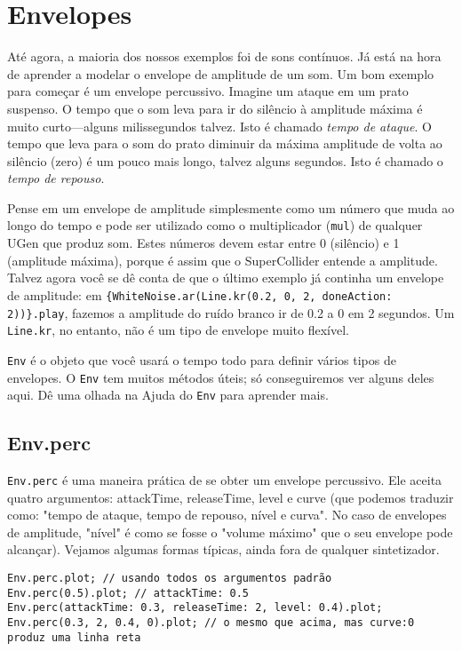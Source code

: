 \section{Envelopes}

Até agora, a maioria dos nossos exemplos foi de sons contínuos. Já está na hora de aprender a modelar o envelope de amplitude de um som. Um bom exemplo para começar é um envelope percussivo. Imagine um ataque em um prato suspenso. O tempo que o som leva para ir do silêncio à amplitude máxima é muito curto---alguns milissegundos talvez. Isto é chamado \emph{tempo de ataque}. O tempo que leva para o som do prato diminuir da máxima amplitude de volta ao silêncio (zero) é um pouco mais longo, talvez alguns segundos. Isto é chamado o \emph{tempo de repouso}.

Pense em um envelope de amplitude simplesmente como um número que muda ao longo do tempo e pode ser utilizado como o multiplicador (\texttt{mul}) de qualquer UGen que produz som. Estes números devem estar entre 0 (silêncio) e 1 (amplitude máxima), porque é assim que o SuperCollider entende a amplitude. Talvez agora você se dê conta de que o último exemplo já continha um envelope de amplitude: em \texttt{\{WhiteNoise.ar(Line.kr(0.2, 0, 2, doneAction: 2))\}.play}, fazemos a amplitude do ruído branco ir de 0.2 a 0 em 2 segundos. Um \texttt{Line.kr}, no entanto, não é um tipo de envelope muito flexível.

\texttt{Env} é o objeto que você usará o tempo todo para definir vários tipos de envelopes. O \texttt{Env} tem muitos métodos úteis; só conseguiremos ver alguns deles aqui. Dê uma olhada na Ajuda do \texttt{Env} para aprender mais. 

\subsection{Env.perc}

\texttt{Env.perc} é uma maneira prática de se obter um envelope percussivo. Ele aceita quatro argumentos:  attackTime, releaseTime, level e curve (que podemos traduzir como: "tempo de ataque, tempo de repouso, nível e curva". No caso de envelopes de amplitude, "nível" é como se fosse o "volume máximo" que o seu envelope pode alcançar). Vejamos algumas formas típicas, ainda fora de qualquer sintetizador.

\begin{lstlisting}[style=SuperCollider-IDE, basicstyle=\scttfamily\footnotesize]
Env.perc.plot; // usando todos os argumentos padrão
Env.perc(0.5).plot; // attackTime: 0.5
Env.perc(attackTime: 0.3, releaseTime: 2, level: 0.4).plot;
Env.perc(0.3, 2, 0.4, 0).plot; // o mesmo que acima, mas curve:0 produz uma linha reta
\end{lstlisting}
 
